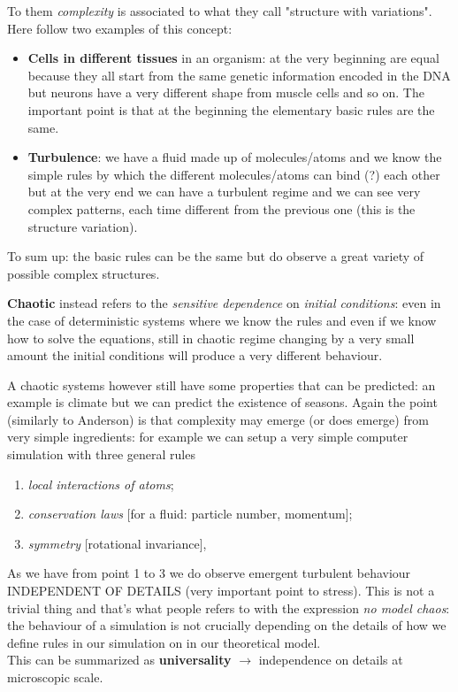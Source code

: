 \documentclass[\main/main.tex]{subfiles}
\begin{document}
To them \textit{complexity} is associated to what they call "structure with variations". Here follow two examples of this concept:
\begin{itemize}
    \item \textbf{Cells in different tissues} in an organism: at the very beginning are equal because they all start from the same genetic information encoded in the DNA but neurons have a very different shape from muscle cells and so on. The important point is that at the beginning the elementary basic rules are the same.
    \item \textbf{Turbulence}: we have a fluid made up of molecules/atoms and we know the simple rules by which the different molecules/atoms can bind (?) each other but at the very end we can have a turbulent regime and we can see very complex patterns, each time different from the previous one (this is the structure variation).
\end{itemize}

To sum up: the basic rules can be the same but do observe a great variety of possible complex structures.

\medskip

\textbf{Chaotic} instead refers to the \textit{sensitive dependence} on \textit{initial conditions}: even in the case of deterministic systems where we know the rules and even if we know how to solve the equations, still in chaotic regime changing by a very small amount the initial conditions will produce a very different behaviour. 

A chaotic systems however still have some properties that can be predicted: an example is climate but we can predict the existence of seasons. Again the point (similarly to Anderson) is that complexity may emerge (or does emerge) from very simple ingredients: for example we can setup a very simple computer simulation with three general rules
\begin{enumerate}
    \item \textit{local interactions of atoms};
    \item \textit{conservation laws} [for a fluid: particle number, momentum];
    \item \textit{symmetry} [rotational invariance],
\end{enumerate}

As we have from point 1 to 3 we do observe emergent turbulent behaviour INDEPENDENT OF DETAILS (very important point to stress). This is not  a trivial thing and that's what people refers to with the expression \textit{no model chaos}: the behaviour of a simulation is not crucially depending on the details of how we define rules in our simulation on in our theoretical model. \\
This can be summarized as \textbf{universality} $\to$ independence on details at microscopic scale.
\end{document}
